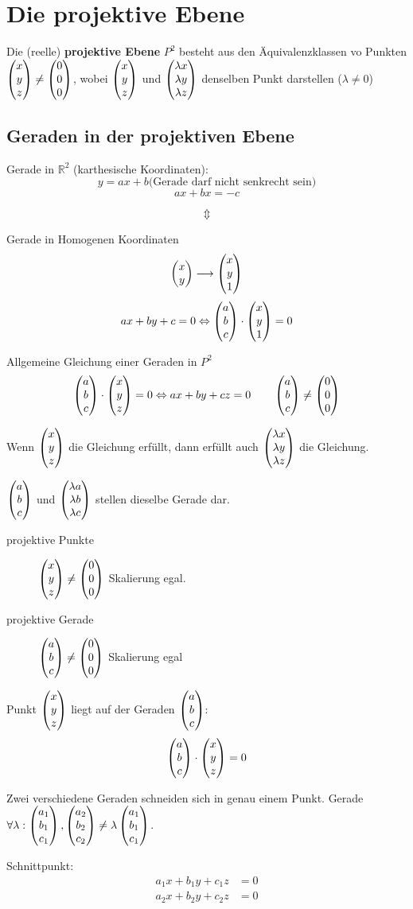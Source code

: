 \section{Die projektive Ebene}
\Defi Die (reelle) \textbf{projektive Ebene} $P^2$ besteht aus den Äquivalenzklassen vo Punkten
	$\begin{pmatrix}x\\y\\z\end{pmatrix} \neq \begin{pmatrix}0\\0\\0\end{pmatrix}$, wobei $\begin{pmatrix}x\\y\\z\end{pmatrix}$ und $\begin{pmatrix}\lambda x\\\lambda y\\\lambda z\end{pmatrix}$
	denselben Punkt darstellen ($\lambda \neq 0$)

\subsection{Geraden in der projektiven Ebene}
Gerade in $\mathbb{R}^2$ (karthesische Koordinaten):
 \[y = ax + b \text{(Gerade darf nicht senkrecht sein)}\]
 \[ax + bx = -c\]

\[\Updownarrow\]

Gerade in Homogenen Koordinaten
\[\begin{pmatrix}x\\y\end{pmatrix} \longrightarrow \begin{pmatrix}x\\y\\1\end{pmatrix}\]
\[ax + by + c = 0 \Leftrightarrow \begin{pmatrix}a\\b\\c\end{pmatrix} \cdot \begin{pmatrix}x\\y\\1\end{pmatrix} = 0\]

Allgemeine Gleichung einer Geraden in $P^2$
\[\begin{pmatrix}a\\b\\c\end{pmatrix} \cdot \begin{pmatrix}x\\y\\z\end{pmatrix} = 0 \Leftrightarrow ax + by + cz = 0 \qquad \begin{pmatrix}a\\b\\c\end{pmatrix} \neq \begin{pmatrix}0\\0\\0\end{pmatrix}\]

Wenn $\begin{pmatrix}x\\y\\z\end{pmatrix}$ die Gleichung erfüllt, dann erfüllt auch $\begin{pmatrix}\lambda x\\\lambda y\\\lambda z\end{pmatrix}$ die Gleichung.

$\begin{pmatrix}a\\b\\c\end{pmatrix}$ und $\begin{pmatrix}\lambda a\\\lambda b\\\lambda c\end{pmatrix}$ stellen dieselbe Gerade dar.

\begin{description}
 \item[projektive Punkte] $\begin{pmatrix}x\\y\\z\end{pmatrix} \neq \begin{pmatrix}0\\0\\0\end{pmatrix}$ Skalierung egal.
 \item[projektive Gerade] $\begin{pmatrix}a\\b\\c\end{pmatrix} \neq \begin{pmatrix}0\\0\\0\end{pmatrix}$ Skalierung egal
\end{description}
\Satz Punkt $\begin{pmatrix}x\\y\\z\end{pmatrix}$ liegt auf der Geraden $\begin{pmatrix}a\\b\\c\end{pmatrix}$:
\[\begin{pmatrix}a\\b\\c\end{pmatrix} \cdot \begin{pmatrix}x\\y\\z\end{pmatrix} = 0\]

\Satz	Zwei verschiedene Geraden schneiden sich in genau einem Punkt.
\Bew	Gerade $\forall \lambda: \begin{pmatrix}a_1\\b_1\\c_1\end{pmatrix}, \begin{pmatrix}a_2\\b_2\\c_2\end{pmatrix} \neq \lambda \begin{pmatrix}a_1\\b_1\\c_1\end{pmatrix}$.

Schnittpunkt:
\begin{align*}
 a_1 x + b_1 y + c_1 z &= 0\\
 a_2 x + b_2 y + c_2 z &= 0
\end{align*}


